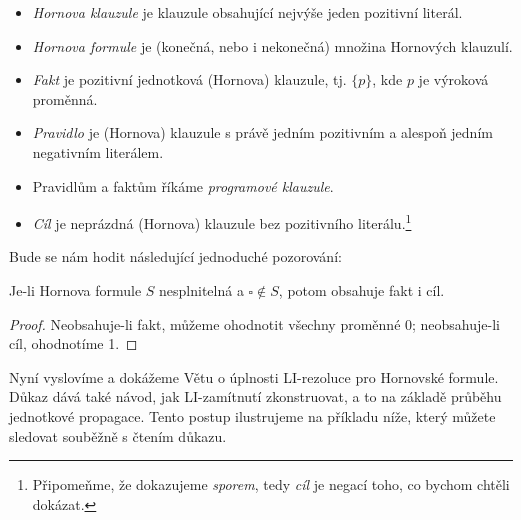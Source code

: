 \begin{itemize}
    \item \emph{Hornova klauzule} je klauzule obsahující nejvýše jeden pozitivní literál.
    \item \emph{Hornova formule} je (konečná, nebo i nekonečná) množina Hornových klauzulí.
    \item \emph{Fakt} je pozitivní jednotková (Hornova) klauzule, tj. $\{p\}$, kde $p$ je výroková proměnná.
    \item \emph{Pravidlo} je (Hornova) klauzule s právě jedním pozitivním a alespoň jedním negativním literálem.
    \item Pravidlům a faktům říkáme \emph{programové klauzule}.
    \item \emph{Cíl} je neprázdná (Hornova) klauzule bez pozitivního literálu.\footnote{Připomeňme, že dokazujeme \emph{sporem}, tedy \emph{cíl} je negací toho, co bychom chtěli dokázat.}
\end{itemize}

Bude se nám hodit následující jednoduché pozorování:

\begin{observation}\label{observation:horn-fact-goal}
    Je-li Hornova formule $S$ nesplnitelná a $\square\notin S$, potom obsahuje fakt i cíl.
\end{observation}
\begin{proof}
    Neobsahuje-li fakt, můžeme ohodnotit všechny proměnné 0; neobsahuje-li cíl, ohodnotíme 1.
\end{proof}

Nyní vyslovíme a dokážeme Větu o úplnosti LI-rezoluce pro Hornovské formule. Důkaz dává také návod, jak LI-zamítnutí zkonstruovat, a to na základě průběhu jednotkové propagace. Tento postup ilustrujeme na příkladu níže, který můžete sledovat souběžně s čtením důkazu.

